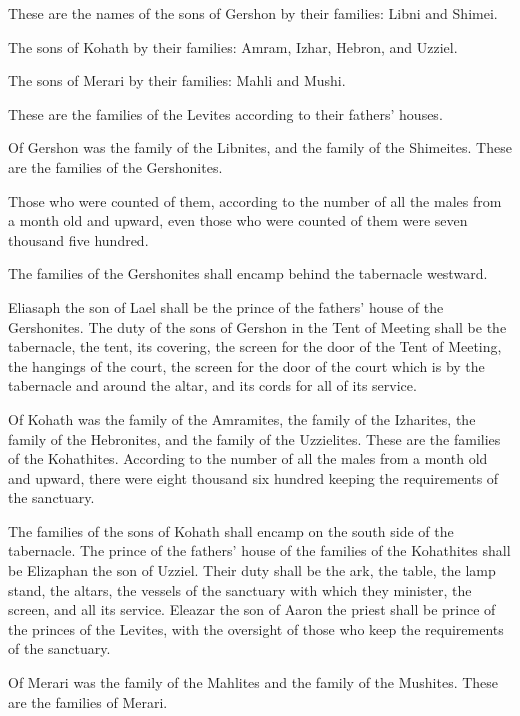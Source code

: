 {\par }{\PP {}These are the names of the sons of Gershon by their families: Libni and Shimei.
\par }{\PP {}The sons of Kohath by their families: Amram, Izhar, Hebron, and Uzziel.
\par }{\PP {}The sons of Merari by their families: Mahli and Mushi.
\par }{\PP These are the families of the Levites according to their fathers’ houses.
\par }{\PP {}Of Gershon was the family of the Libnites, and the family of the Shimeites. These are the families of the Gershonites.
\par }{\PP {}Those who were counted of them, according to the number of all the males from a month old and upward, even those who were counted of them were seven thousand five hundred.
\par }{\PP {}The families of the Gershonites shall encamp behind the tabernacle westward.
\par }{\PP {}Eliasaph the son of Lael shall be the prince of the fathers’ house of the Gershonites.
The duty of the sons of Gershon in the Tent of Meeting shall be the tabernacle, the tent, its covering, the screen for the door of the Tent of Meeting,
the hangings of the court, the screen for the door of the court which is by the tabernacle and around the altar, and its cords for all of its service.
\par }{\PP {}Of Kohath was the family of the Amramites, the family of the Izharites, the family of the Hebronites, and the family of the Uzzielites. These are the families of the Kohathites.
According to the number of all the males from a month old and upward, there were eight thousand six hundred keeping the requirements of the sanctuary.
\par }{\PP {}The families of the sons of Kohath shall encamp on the south side of the tabernacle.
The prince of the fathers’ house of the families of the Kohathites shall be Elizaphan the son of Uzziel.
Their duty shall be the ark, the table, the lamp stand, the altars, the vessels of the sanctuary with which they minister, the screen, and all its service.
Eleazar the son of Aaron the priest shall be prince of the princes of the Levites, with the oversight of those who keep the requirements of the sanctuary.
\par }{\PP {}Of Merari was the family of the Mahlites and the family of the Mushites. These are the families of Merari.
}
